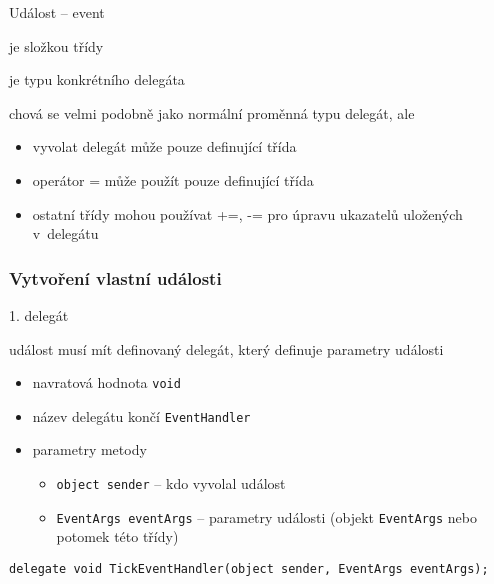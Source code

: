 \begin{frame}[fragile]
\begin{bitemize}{Událost -- event}
\item je složkou třídy
\item je  typu konkrétního delegáta
\item chová se velmi podobně jako normální proměnná typu delegát, ale
\begin{itemize}
\item vyvolat delegát může pouze definující třída
\item operátor = může použít pouze definující třída
\item ostatní třídy mohou používat +=, -= pro úpravu ukazatelů uložených v~delegátu
\end{itemize}
\end{bitemize}

\end{frame}






\begin{frame}[fragile]
\frametitle{Vytvoření vlastní události}
\vfill
\begin{bitemize}{1. delegát}
\item událost musí mít definovaný delegát, který definuje parametry události
\begin{itemize}
\item navratová hodnota \lstinline|void|
\item název delegátu končí \lstinline|EventHandler|
\item parametry metody
\begin{itemize}
\item \lstinline|object sender| -- kdo vyvolal událost
\item \lstinline|EventArgs eventArgs| -- parametry události (objekt \lstinline|EventArgs| nebo potomek této třídy)
\end{itemize}
\end{itemize}
\end{bitemize}
\vfill
\begin{yesblock}
\begin{lstlisting}
delegate void TickEventHandler(object sender, EventArgs eventArgs);
\end{lstlisting}
\end{yesblock}
\vfill
\end{frame}




